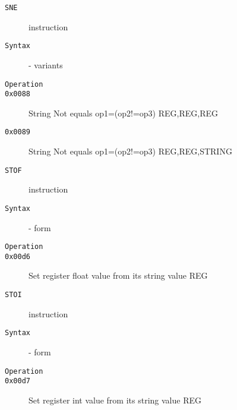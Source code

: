 \clearpage
\begin{description}
\item[\texttt{SNE}] instruction\\
\item[\texttt{Syntax}] - variants\\

\item[\texttt{Operation}]
\item[\texttt{}]
\item[\texttt{0x0088}] String Not equals op1=(op2!=op3)  {REG,REG,REG}       \\
\item[\texttt{0x0089}] String Not equals op1=(op2!=op3)  {REG,REG,STRING}    \\
\end{description}
\clearpage
\begin{description}
\item[\texttt{STOF}] instruction\\
\item[\texttt{Syntax}] - form \\

\item[\texttt{Operation}]
\item[\texttt{}]
\item[\texttt{0x00d6}] Set register float value from its string value  {REG}               \\
\end{description}
\clearpage
\begin{description}
\item[\texttt{STOI}] instruction\\
\item[\texttt{Syntax}] - form \\

\item[\texttt{Operation}]
\item[\texttt{}]
\item[\texttt{0x00d7}] Set register int value from its string value  {REG}               \\
\end{description}
